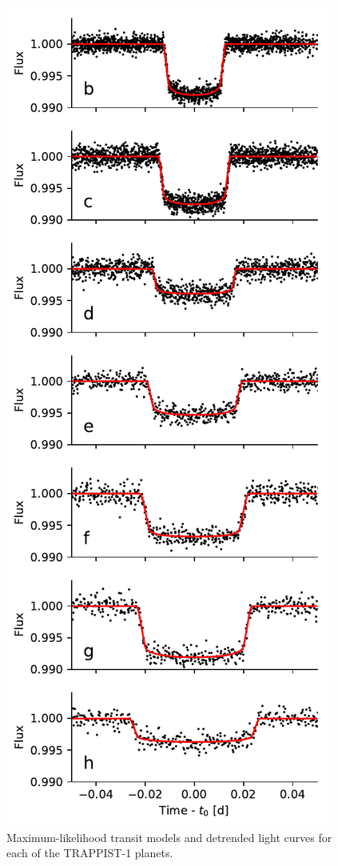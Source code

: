 \begin{figure}[H]
    \centering
    \includegraphics[scale=0.83]{trappist1_robin/transits.pdf}
    \caption{Maximum-likelihood transit models and detrended \spitzer light curves for each of the TRAPPIST-1 planets.}
    \label{fig:transits}
\end{figure}

